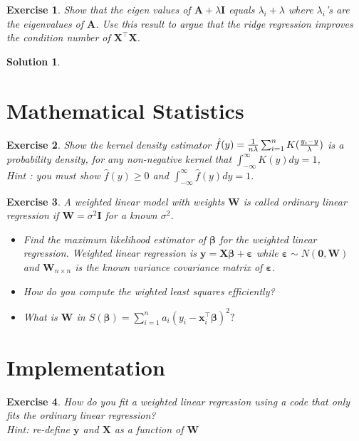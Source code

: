 \documentclass[12pt,a4paper]{article}
\def \y {\mathbf y}
\def \X {\mathbf X}
\def \t {^\top}
\def \x {\mathbf x}
\def \bbeta {\boldsymbol \beta}
\def \eeps {\boldsymbol \varepsilon}
\def \sumi {\sum_{i=1}^n}
\newtheorem{exercise}{Exercise}
\numberwithin{exercise}{section} %
\newtheorem{solution}{Solution}
\numberwithin{solution}{section} %
\begin{document}
\begin{exercise}
Show that the eigen values of $\mathbf A+\lambda \mathbf I$ equals $\lambda_i+\lambda$ where $\lambda_i$'s are the eigenvalues of $\mathbf A$. Use this result to argue that the ridge regression improves the condition number of $\X\t\X$.\\
\end{exercise}
\begin{solution}
\end{solution}
\newpage 
\section{Mathematical Statistics}
\begin{exercise}
Show the kernel density estimator $\hat f (y)={1\over n\lambda} \sum_{i=1}^n K({y_i-y\over \lambda })$ 
 is a probability density,  for any non-negative kernel that $ \int_{-\infty}^\infty K(y)dy=1$, \\
 Hint : you must show $\hat f(y)\geq 0$ and $\int_{-\infty}^\infty \hat f(y)dy=1$.\\
\end{exercise}


\begin{exercise}
A weighted linear model with weights $ \mathbf W$ is called ordinary linear regression if $\mathbf 
W=\sigma^2 \mathbf I$ for a known $\sigma^2$.
\begin{itemize}
\item Find the maximum likelihood estimator of $ \bbeta$ for the weighted linear regression. Weighted linear regression   is $\mathbf y=\X \bbeta+ \eeps$ while $\boldsymbol \varepsilon \sim N(\mathbf 0, \mathbf W)$ and $\mathbf W_{n\times n}$ is the known variance covariance matrix of $\boldsymbol \varepsilon$. 
\item How do you compute the wighted least squares efficiently?
\item What is $\mathbf W$ in $S(\bbeta) = \sumi a_i (y_i -\x_i\t \bbeta)^2 ?$
\end{itemize}
\end{exercise}

\newpage
\section{Implementation}

\begin{exercise}
How do you fit a weighted linear regression using a code that only fits the ordinary linear regression?\\
Hint: re-define $\y$  and $\X$ as a function of $\mathbf W$
\end{exercise}
\end{document}
